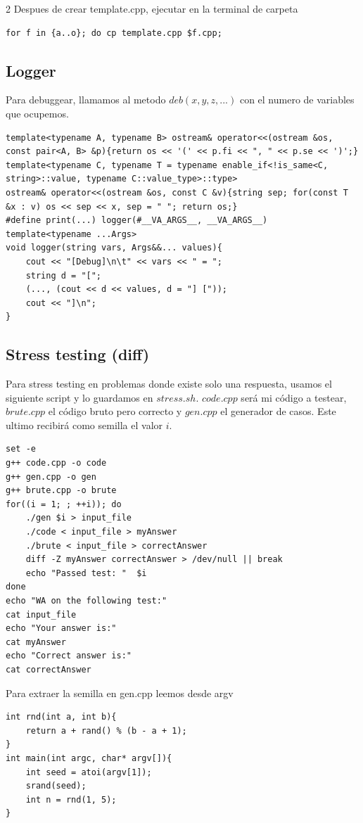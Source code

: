 \documentclass[10pt,spanish,mexico]{article}
\numberwithin{equation}{section}
\begin{document}
\begin{multicols}{2}
Despues de crear template.cpp, ejecutar en la terminal de carpeta
\begin{verbatim}
for f in {a..o}; do cp template.cpp $f.cpp;
\end{verbatim}

\vspace{-1.2\baselineskip}
\hrulefill
\subsection{Logger}
Para debuggear, llamamos al metodo $deb(x,y,z,...)$ con el numero de variables que ocupemos.
\begin{verbatim}
template<typename A, typename B> ostream& operator<<(ostream &os, const pair<A, B> &p){return os << '(' << p.fi << ", " << p.se << ')';}
template<typename C, typename T = typename enable_if<!is_same<C, string>::value, typename C::value_type>::type>
ostream& operator<<(ostream &os, const C &v){string sep; for(const T &x : v) os << sep << x, sep = " "; return os;}
#define print(...) logger(#__VA_ARGS__, __VA_ARGS__)
template<typename ...Args>
void logger(string vars, Args&&... values){
    cout << "[Debug]\n\t" << vars << " = ";
    string d = "[";
    (..., (cout << d << values, d = "] ["));
    cout << "]\n";
}
\end{verbatim}

\vspace{-1.2\baselineskip}
\hrulefill
\subsection{Stress testing (diff)}
Para stress testing en problemas donde existe solo una respuesta, usamos el siguiente script y lo guardamos en $stress.sh$. $code.cpp$ será mi código a testear, $brute.cpp$ el código bruto pero correcto y $gen.cpp$ el generador de casos. Este ultimo recibirá como semilla el valor $i$.
\begin{verbatim}
set -e
g++ code.cpp -o code
g++ gen.cpp -o gen
g++ brute.cpp -o brute
for((i = 1; ; ++i)); do
    ./gen $i > input_file
    ./code < input_file > myAnswer
    ./brute < input_file > correctAnswer
    diff -Z myAnswer correctAnswer > /dev/null || break
    echo "Passed test: "  $i
done
echo "WA on the following test:"
cat input_file
echo "Your answer is:"
cat myAnswer
echo "Correct answer is:"
cat correctAnswer
\end{verbatim}

Para extraer la semilla en gen.cpp leemos desde argv
\begin{verbatim}
int rnd(int a, int b){
    return a + rand() % (b - a + 1);
}
int main(int argc, char* argv[]){
    int seed = atoi(argv[1]);
    srand(seed);
    int n = rnd(1, 5);
}
\end{verbatim}


\end{multicols}
\end{document}

